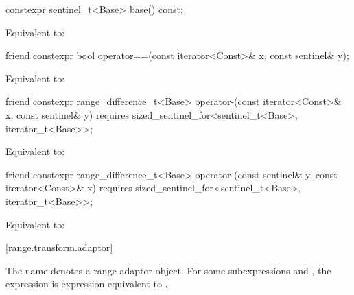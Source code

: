 \begin{itemdecl}
constexpr sentinel_t<Base> base() const;
\end{itemdecl}

\begin{itemdescr}
\pnum
\effects Equivalent to: 
\end{itemdescr}

\begin{itemdecl}
friend constexpr bool operator==(const iterator<Const>& x, const sentinel& y);
\end{itemdecl}

\begin{itemdescr}
\pnum
\effects Equivalent to: 
\end{itemdescr}

%
\begin{itemdecl}
friend constexpr range_difference_t<Base>
  operator-(const iterator<Const>& x, const sentinel& y)
    requires sized_sentinel_for<sentinel_t<Base>, iterator_t<Base>>;
\end{itemdecl}

\begin{itemdescr}
\pnum
\effects Equivalent to: 
\end{itemdescr}

%
\begin{itemdecl}
friend constexpr range_difference_t<Base>
  operator-(const sentinel& y, const iterator<Const>& x)
    requires sized_sentinel_for<sentinel_t<Base>, iterator_t<Base>>;
\end{itemdecl}

\begin{itemdescr}
\pnum
\effects Equivalent to: 
\end{itemdescr}

[range.transform.adaptor]{}

\pnum
The name  denotes a
range adaptor object.
For some subexpressions  and , the expression
 is expression-equivalent to
.


